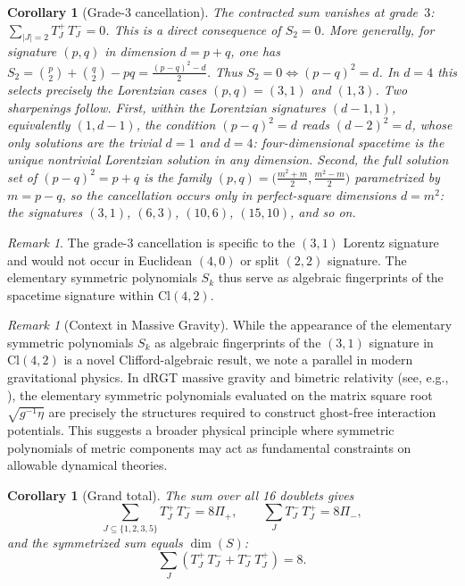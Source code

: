 \documentclass{birkjour}
\newtheorem{cor}[thm]{Corollary}
\theoremstyle{definition}
\theoremstyle{remark}
\newtheorem{rem}[thm]{Remark}
\numberwithin{equation}{section}
\newcommand{\Cl}{\mathrm{Cl}}
\providecommand{\rev}{{}}
\begin{document}
\begin{cor}[Grade-3 cancellation]\label{cor:grade3}
The contracted sum vanishes at grade~$3$:
$\sum_{|J|=2}T^+_J\,T^-_J=0$.
This is a direct consequence of $S_2=0$.
More generally, for signature $(p,q)$ in dimension
$d=p+q$, one has
$S_2=\binom{p}{2}+\binom{q}{2}-pq=\tfrac{(p-q)^2-d}{2}$.
Thus $S_2=0\iff(p-q)^2=d$.
In $d=4$ this selects precisely the Lorentzian cases
$(p,q)=(3,1)$ and $(1,3)$.
\rev{Two sharpenings follow. First, within the Lorentzian
signatures $(d-1,1)$, equivalently $(1,d-1)$, the condition
$(p-q)^2=d$ reads $(d-2)^2=d$, whose only solutions are the
trivial $d=1$ and $d=4$: four-dimensional spacetime is the
unique nontrivial Lorentzian solution in any dimension.
Second, the full solution set of $(p-q)^2=p+q$ is the family
$(p,q)=\bigl(\tfrac{m^2+m}{2},\tfrac{m^2-m}{2}\bigr)$
parametrized by $m=p-q$, so the cancellation occurs only in
perfect-square dimensions $d=m^2$: the signatures $(3,1)$,
$(6,3)$, $(10,6)$, $(15,10)$, and so on.}
\end{cor}

\begin{rem}\label{rem:signature-fingerprint}
The grade-3 cancellation is specific to the $(3,1)$
Lorentz signature and would not occur in Euclidean
$(4,0)$ or split $(2,2)$ signature.
The elementary symmetric polynomials $S_k$ thus serve
as algebraic fingerprints of the spacetime signature
within $\Cl(4,2)$.
\end{rem}



\begin{rem}[Context in Massive Gravity]\label{rem:massive}
While the appearance of the elementary symmetric polynomials $S_k$ as algebraic fingerprints of the $(3,1)$ signature in $\Cl(4,2)$ is a novel Clifford-algebraic result, we note a  parallel in modern gravitational physics. In dRGT massive gravity and bimetric relativity (see, e.g., 
\cite{derham2011, Hassan2011}), the elementary symmetric polynomials evaluated on the matrix square root $\sqrt{g^{-1}\eta}$ are precisely the structures required to construct ghost-free interaction potentials. This suggests a broader physical principle where symmetric polynomials of metric components may act as fundamental constraints on allowable dynamical theories.
\end{rem}

\begin{cor}[Grand total]\label{cor:total}
The sum over all 16 doublets gives
\begin{equation}\label{eq:grand}
\sum_{J\subseteq\{1,2,3,5\}}T^+_J\,T^-_J=8\Pi_+,
\qquad
\sum_{J}T^-_J\,T^+_J=8\Pi_-,
\end{equation}
and the symmetrized sum equals $\dim(S)$:
\begin{equation}\label{eq:dim}
\sum_{J}(T^+_J\,T^-_J+T^-_J\,T^+_J)=8.
\end{equation}
\end{cor}
\end{document}
